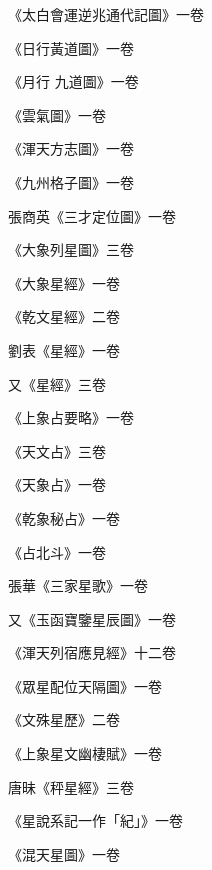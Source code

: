\begin{pinyinscope}
 《太白會運逆兆通代記圖》一卷



 《日行黃道圖》一卷



 《月行
 九道圖》一卷



 《雲氣圖》一卷



 《渾天方志圖》一卷



 《九州格子圖》一卷



 張商英《三才定位圖》一卷



 《大象列星圖》三卷



 《大象星經》一卷



 《乾文星經》二卷



 劉表《星經》一卷



 又《星經》三卷



 《上象占要略》一卷



 《天文占》三卷



 《天象占》一卷



 《乾象秘占》一卷



 《占北斗》一卷



 張華《三家星歌》一卷



 又《玉函寶鑒星辰圖》一卷



 《渾天列宿應見經》十二卷



 《眾星配位天隔圖》一卷



 《文殊星歷》二卷



 《上象星文幽棲賦》一卷



 唐昧《秤星經》三卷



 《星說系記一作「紀」》一卷



 《混天星圖》一卷




\end{pinyinscope}
